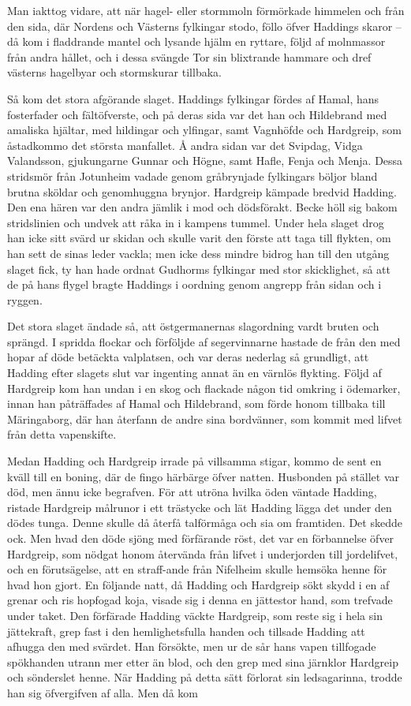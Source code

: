 Man iakttog vidare, att när hagel- eller stormmoln förmörkade himmelen
och från den sida, där Nordens och Västerns fylkingar stodo, föllo öfver
Haddings skaror -- då kom i fladdrande mantel och lysande hjälm en
ryttare, följd af molnmassor från andra hållet, och i dessa svängde Tor
sin blixtrande hammare och dref västerns hagelbyar och stormskurar
tillbaka.

Så kom det stora afgörande slaget. Haddings fylkingar fördes af Hamal,
hans fosterfader och fältöfverste, och på deras sida var det han och
Hildebrand med amaliska hjältar, med hildingar och ylfingar, samt
Vagnhöfde och Hardgreip, som åstadkommo det största manfallet. Å andra
sidan var det Svipdag, Vidga Valandsson, gjukungarne Gunnar och Högne,
samt Hafle, Fenja och Menja. Dessa stridsmör från Jotunheim vadade genom
gråbrynjade fylkingars böljor bland brutna sköldar och genomhuggna
brynjor. Hardgreip kämpade bredvid Hadding. Den ena hären var den andra
jämlik i mod och dödsförakt. Becke höll sig bakom stridslinien och
undvek att råka in i kampens tummel. Under hela slaget drog han icke
sitt svärd ur skidan och skulle varit den förste
att taga till flykten, om han sett de sinas leder vackla; men icke dess
mindre bidrog han till den utgång slaget fick, ty han hade ordnat
Gudhorms fylkingar med stor skicklighet, så att de på hans flygel bragte
Haddings i oordning genom angrepp från sidan och i ryggen.

Det stora slaget ändade så, att östgermanernas slagordning vardt bruten
och sprängd. I spridda flockar och förföljde af segervinnarne hastade de
från den med hopar af döde betäckta valplatsen, och var deras nederlag
så grundligt, att Hadding efter slagets slut var ingenting annat än en
värnlös flykting. Följd af Hardgreip kom han undan i en skog och
flackade någon tid omkring i ödemarker, innan han påträffades af Hamal
och Hildebrand, som förde honom tillbaka till Märingaborg, där han
återfann de andre sina bordvänner, som kommit med lifvet från detta
vapenskifte.

Medan Hadding och Hardgreip irrade på villsamma stigar, kommo de sent en
kväll till en boning, där de fingo härbärge öfver natten. Husbonden på
stället var död, men ännu icke begrafven. För att utröna hvilka öden
väntade Hadding, ristade Hardgreip målrunor i ett trästycke och lät
Hadding lägga det under den dödes tunga. Denne skulle då återfå
talförmåga och sia om framtiden. Det skedde ock. Men hvad den döde sjöng
med förfärande röst, det var en förbannelse öfver Hardgreip, som nödgat
honom återvända från lifvet i underjorden till jordelifvet, och en
förutsägelse, att en straff-ande från Nifelheim skulle hemsöka henne för
hvad hon gjort. En följande natt, då Hadding och Hardgreip sökt skydd i
en af grenar och ris hopfogad koja, visade sig i denna en jättestor
hand, som trefvade under taket. Den förfärade Hadding väckte Hardgreip,
som reste sig i hela sin jättekraft, grep fast i den hemlighetsfulla
handen och tillsade Hadding att afhugga den med svärdet. Han försökte,
men ur de sår hans vapen tillfogade spökhanden utrann mer etter än blod,
och den grep med sina järnklor Hardgreip och sönderslet henne. När
Hadding på detta sätt förlorat sin ledsagarinna, trodde han sig
öfvergifven af alla. Men då kom


